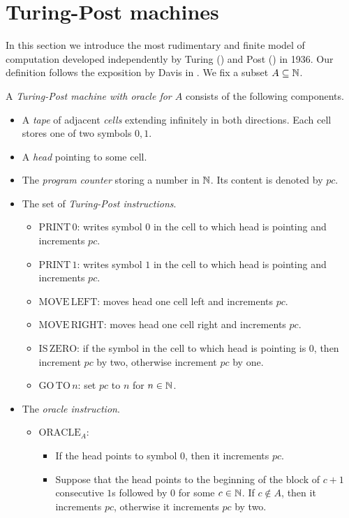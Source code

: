 \documentclass[10pt]{amsart}
\begin{document}
\section{Turing-Post machines}
\noindent
In this section we introduce the most rudimentary and finite model of computation developed independently by Turing (\cite{turing1936computable}) and Post (\cite{post1936finite}) in 1936. Our definition follows the exposition by Davis in \cite{davis1978computation}. We fix a subset $A \subseteq {\mathbb N}$.

\begin{definition}
	A \textit{Turing-Post machine with oracle for $A$} consists of the following components.
	\begin{itemize}
		\item A \textit{tape} of adjacent \textit{cells} extending infinitely in both directions. Each cell stores one of two symbols $0,1$.
		\item A \textit{head} pointing to some cell.
		\item The \textit{program counter} storing a number in ${\mathbb N}$. Its content is denoted by $pc$.
		\item The set of \textit{Turing-Post instructions}.
		      \begin{itemize}
			      \item[] $\mathrm{PRINT}\,0$: writes symbol $0$ in the cell to which head is pointing and increments $pc$.
			      \item[] $\mathrm{PRINT}\,1$: writes symbol $1$ in the cell to which head is pointing and increments $pc$.
			      \item[] $\mathrm{MOVE\,LEFT}$: moves head one cell left and increments $pc$.
			      \item[] $\mathrm{MOVE\,RIGHT}$: moves head one cell right and increments $pc$.
			      \item[] $\mathrm{IS\,ZERO}$: if the symbol in the cell to which head is pointing is $0$, then increment $pc$ by two, otherwise increment $pc$ by one.
			      \item[] $\mathrm{GO\,TO}\,n$: set $pc$ to $n$ for $n \in {\mathbb N}$.
		      \end{itemize}
		\item The \textit{oracle instruction}.
		      \begin{itemize}
			      \item[] $\mathrm{ORACLE}_A$:
				      \begin{itemize}
					      \item[] If the head points to symbol $0$, then it increments $pc$.
					      \item[] Suppose that the head points to the beginning of the block of $c + 1$ consecutive $1$s followed by $0$ for some $c \in {\mathbb N}$. If $c \not \in A$, then it increments $pc$, otherwise it increments $pc$ by two.
				      \end{itemize}
		      \end{itemize}
	\end{itemize}
\end{definition}
\end{document}
